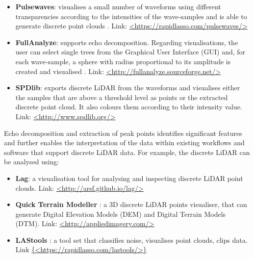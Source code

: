 \documentclass{subfiles}
\begin{document}
	\begin{itemize}
		\item \textbf{Pulsewaves}: visualises a small number of waveforms using different transparencies according to the intensities of the wave-samples and is able to generate discrete point clouds \cite{Isenburg2012Pulsewaves}. \newline Link: \url{<https://rapidlasso.com/pulsewaves/>}
	    \item \textbf{FullAnalyze}: supports echo decomposition. Regarding visualisations, the user can select single trees from the Graphical User Interface (GUI) and, for each wave-sample, a sphere with radius proportional to its amplitude is created and visualised \cite{Chauve2009}. \newline Link: \url{<http://fullanalyze.sourceforge.net/>} 
    	\item \textbf{SPDlib}: exports discrete LiDAR from the waveforms and visualises either the samples that are above a threshold level as points or the extracted discrete point cloud. It also colours them according to their intensity value\cite{Bunting2013}. \newline Link: \url{<http://www.spdlib.org/>} 
	\end{itemize}

	\par Echo decomposition and extraction of peak points identifies significant features and further enables the interpretation of the data within existing workflows and software that support discrete LiDAR data. For example, the discrete LiDAR can be analysed using: 
	
	\begin{itemize}
	\item \textbf{Lag}: a visualisation tool for analysing and inspecting discrete LiDAR point clouds. \newline Link: \url{<http://arsf.github.io/lag/>}
	
	\item \textbf{Quick Terrain Modeller} : a 3D discrete LiDAR points visualiser, that can generate Digital Elevation Models (DEM) and Digital Terrain Models (DTM). \newline Link: \url{<http://appliedimagery.com/>}
	
	\item \textbf{LAStools} : a tool set that classifies noise, visualises point clouds, clips data.  \newline Link \url{{<https://rapidlasso.com/lastools/>}}
	\end{itemize}
		
\end{document}
